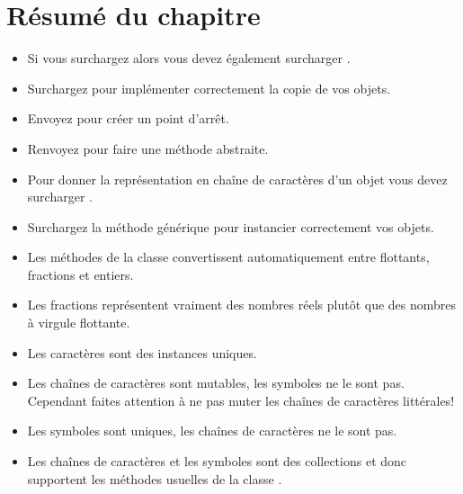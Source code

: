 \documentclass[a4paper,10pt,twoside]{book}
\begin{document}
\section{Résumé du chapitre}

\begin{itemize}

  \item Si vous surchargez \ct{=} alors vous devez également surcharger .

  \item Surchargez  pour implémenter correctement la copie de vos objets.

  \item Envoyez  pour créer un point d'arrêt.

  \item Renvoyez  pour faire une méthode abstraite.

  \item Pour donner la représentation en chaîne de caractères d'un objet  vous devez surcharger .

  \item Surchargez la méthode générique  pour instancier correctement vos objets.

  \item Les méthodes de la classe  convertissent automatiquement entre flottants, fractions et entiers.

  \item Les fractions représentent vraiment des nombres réels plutôt que des nombres à virgule flottante.

  \item Les caractères sont des instances uniques.

  \item Les chaînes de caractères sont mutables, les symboles ne le sont pas.
  Cependant faites attention à ne pas muter les chaînes de caractères littérales!

  \item Les symboles sont uniques, les chaînes de caractères ne le sont pas.

  \item Les chaînes de caractères et les symboles sont des collections et donc supportent les méthodes usuelles de la classe .

\end{itemize}

\ifx\wholebook\relax\else
   
   
\end{document}

